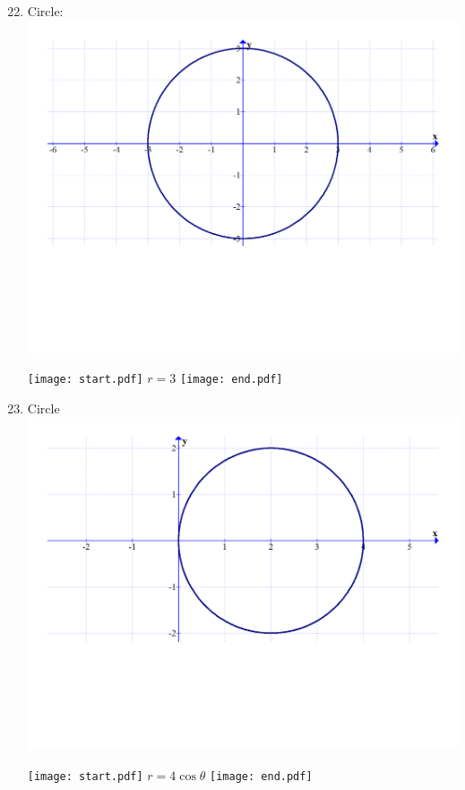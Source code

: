 \documentclass[12pt]{article}
\begin{document}
\begin{enumerate}
\setcounter{enumi}{21}

\item Circle:\\
\includegraphics[scale=0.35]{graph1.pdf}

\texttt{[image: start.pdf]}
{{$r=3$}}
\texttt{[image: end.pdf]}


\item Circle\\
\includegraphics[scale=0.35]{graph2.pdf}

\texttt{[image: start.pdf]}
{{$r=4\cos{\theta}$}}
\texttt{[image: end.pdf]}



\end{enumerate}
\end{document}
